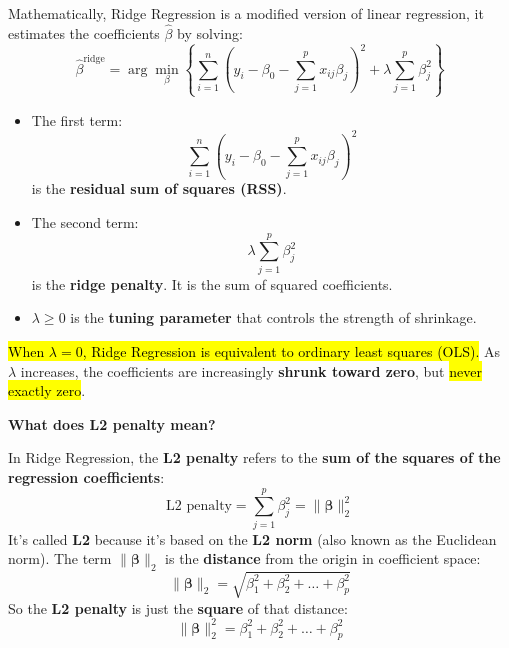 \highspace
Mathematically, Ridge Regression is a modified version of linear regression, it estimates the coefficients $\hat{\beta}$ by solving:
\begin{equation}
    \hat{\beta}^{\text{ridge}} = \arg\min_{\beta} \left\{ \sum_{i=1}^n \left(y_i - \beta_0 - \sum_{j=1}^p x_{ij} \beta_j\right)^2 + \lambda \sum_{j=1}^p \beta_j^2 \right\}
\end{equation}
\begin{itemize}
    \item The first term:
    \begin{equation*}
        \sum_{i=1}^n \left(y_i - \beta_0 - \sum_{j=1}^p x_{ij} \beta_j\right)^2
    \end{equation*}
    is the \textbf{residual sum of squares (RSS)}.
    \item The second term:
    \begin{equation*}
        \lambda \sum_{j=1}^p \beta_j^2
    \end{equation*}
    is the \textbf{ridge penalty}. It is the sum of squared coefficients.
    \item $\lambda \geq 0$ is the \textbf{tuning parameter} that controls the strength of shrinkage.
\end{itemize}
\hl{When $\lambda = 0$, Ridge Regression is equivalent to ordinary least squares (OLS).} As $\lambda$ increases, the coefficients are increasingly \textbf{shrunk toward zero}, but \hl{never exactly zero}.

\highspace
\begin{flushleft}
    \textcolor{Green3}{ \textbf{What does L2 penalty mean?}}
\end{flushleft}
In Ridge Regression, the \textbf{L2 penalty} refers to the \textbf{sum of the squares of the regression coefficients}:
\begin{equation}
    \text{L2 penalty} = \sum_{j=1}^{p} \beta_j^2 = \| \boldsymbol{\beta} \|_2^2
\end{equation}
It's called \textbf{L2} because it's based on the \textbf{L2 norm} (also known as the Euclidean norm). The term $\| \boldsymbol{\beta} \|_2$ is the \textbf{distance} from the origin in coefficient space:
\begin{equation*}
    \| \boldsymbol{\beta} \|_2 = \sqrt{ \beta_1^2 + \beta_2^2 + \dots + \beta_p^2 }
\end{equation*}
So the \textbf{L2 penalty} is just the \textbf{square} of that distance:
\begin{equation*}
    \| \boldsymbol{\beta} \|_2^2 = \beta_1^2 + \beta_2^2 + \dots + \beta_p^2
\end{equation*}

